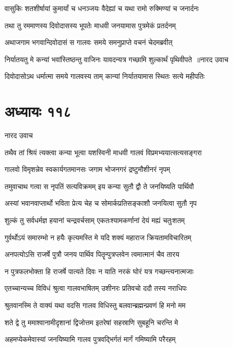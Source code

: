 \twolineshloka
{वासुकिः शतशीर्षायां कुमार्यां च धनञ्जयः}
{वैदेह्यां च यथा रामो रुक्मिण्यां च जनार्दनः}


\twolineshloka
{तथा तु रममाणस्य दिवोदासस्य भूपतेः}
{माधवी जनयामास पुत्रमेकं प्रतर्दनम्}


\twolineshloka
{अथाजगाम भगवान्दिवोदासं स गालवः}
{समये समनुप्राप्ते वचनं चेदमब्रवीत्}


\threelineshloka
{निर्यातयतु मे कन्यां भवांस्तिष्ठन्तु वाजिनः}
{यावदन्यत्र गच्छामि शुल्कार्थं पृथिवीपते ॥नारद उवाच}
{}


\twolineshloka
{दिवोदासोऽथ धर्मात्मा समये गालवस्य ताम्}
{कान्यां निर्यातयामास स्थितः सत्ये महीपतिः}


\chapter{अध्यायः ११८}
\twolineshloka
{नारद उवाच}
{}


\twolineshloka
{तथैव तां श्रियं त्यक्त्वा कन्या भूत्वा यशस्विनी}
{माधवी गालवं विप्रमभ्ययात्सत्यसङ्गरा}


\twolineshloka
{गालवो विमृशन्नेव स्वकार्यगतमानसः}
{जगाम भोजनगरं द्रष्टुमौशीनरं नृपम्}


\twolineshloka
{तमुवाचाथ गत्वा स नृपतिं सत्यविक्रमम्}
{इय कन्या सुतौ द्वौ ते जनयिष्यति पार्थिवौ}


\twolineshloka
{अस्यां भवानवाप्तार्थो भविता प्रेत्य चेह च}
{सोमार्कप्रतिसङ्काशौ जनयित्वा सुतौ नृप}


\twolineshloka
{शुल्कं तु सर्वधर्मज्ञ हयानां चन्द्रवर्चसाम्}
{एकतःश्यामकर्णानां देयं मह्यं चतुःशतम्}


\twolineshloka
{गुर्वर्थोऽयं समारम्भो न हयैः कृत्यमस्ति मे}
{यदि शक्यं महाराज क्रियतामविचारितम्}


\twolineshloka
{अनपत्योऽसि राजर्षे पुत्रौ जनय पार्थिव}
{पितॄन्पुत्रप्लवेन त्वमात्मानं चैव तारय}


\twolineshloka
{न पुत्रफलभोक्ता हि राजर्षे पात्यते दिवः}
{न याति नरकं घोरं यत्र गच्छन्त्यनात्मजाः}


\twolineshloka
{एतच्चान्यच्च विविधं श्रुत्वा गालवभाषितम्}
{उशीनरः प्रतिवचो ददौ तस्य नराधिपः}


\twolineshloka
{श्रुतवानस्मि ते वाक्यं यथा वदसि गालव}
{विधिस्तु बलवान्ब्रह्मन्प्रवणं हि मनो मम}


\twolineshloka
{शते द्वे तु ममाश्वानामीदृशानां द्विजोत्तम}
{इतरेषां सहस्राणि सुबहूनि चरन्ति मे}


\twolineshloka
{अहमप्येकमेवास्यां जनयिष्यामि गालव}
{पुत्रवद्भिर्गतं मार्गं गमिष्यामि परैरहम्}


